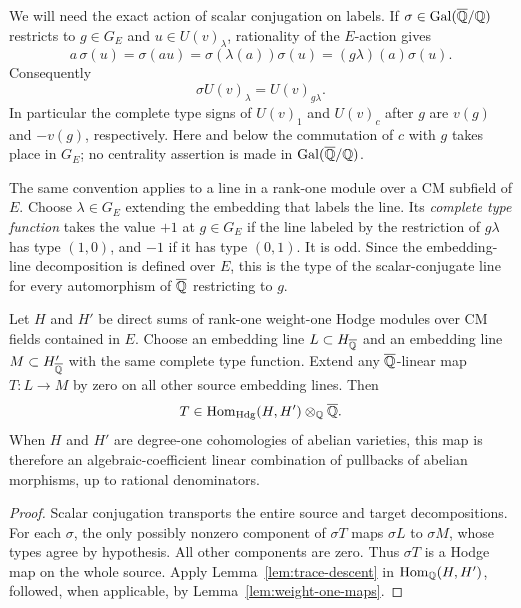 We will need the exact action of scalar conjugation on labels.  If
\(\sigma\in\operatorname{Gal}(\overline{\mathbb{Q}}/\mathbb{Q})\) restricts to \(g\in G_E\) and
\(u\in U(v)_\lambda\), rationality of the \(E\)-action gives
\[
 a\,\sigma(u)=\sigma(au)
             =\sigma(\lambda(a))\sigma(u)
             =(g\lambda)(a)\sigma(u).
\]
Consequently
\begin{equation}\label{eq:cm-label-conjugation}
 \sigma U(v)_\lambda=U(v)_{g\lambda}.
\end{equation}
In particular the complete type signs of \(U(v)_1\) and \(U(v)_c\)
after \(g\) are \(v(g)\) and \(-v(g)\), respectively.  Here and below
the commutation of \(c\) with \(g\) takes place in \(G_E\); no
centrality assertion is made in \(\operatorname{Gal}(\overline{\mathbb{Q}}/\mathbb{Q})\).

The same convention applies to a line in a rank-one module over a CM
subfield of \(E\).  Choose \(\lambda\in G_E\) extending the embedding
that labels the line.  Its \emph{complete type function} takes the value
\(+1\) at \(g\in G_E\) if the line labeled by the restriction of
\(g\lambda\) has type \((1,0)\), and \(-1\) if it has type \((0,1)\).
It is odd.  Since the embedding-line decomposition is defined over
\(E\), this is the type of the scalar-conjugate line for every
automorphism of \(\overline{\mathbb{Q}}\) restricting to \(g\).

\begin{lemma}\label{lem:cm-line-transfer}
Let \(H\) and \(H'\) be direct sums of rank-one weight-one Hodge
modules over CM fields contained in \(E\).  Choose an embedding line
\(L\subset H_{\overline{\mathbb{Q}}}\) and an embedding line \(M\subset H'_{\overline{\mathbb{Q}}}\)
with the same complete type function.  Extend any
\(\overline{\mathbb{Q}}\)-linear map \(T:L\to M\) by zero on all other source
embedding lines.  Then
\[
 T\in\operatorname{Hom}_{\mathrm{Hdg}}(H,H')\otimes_{\mathbb{Q}}\overline{\mathbb{Q}}.
\]
When \(H\) and \(H'\) are degree-one cohomologies of abelian varieties,
this map is therefore an algebraic-coefficient linear combination of
pullbacks of abelian morphisms, up to rational denominators.
\end{lemma}

\begin{proof}
Scalar conjugation transports the entire source and target
decompositions.  For each \(\sigma\), the only possibly nonzero
component of \(\sigma T\) maps \(\sigma L\) to \(\sigma M\), whose
types agree by hypothesis.  All other components are zero.  Thus
\(\sigma T\) is a Hodge map on the whole source.  Apply
Lemma~\ref{lem:trace-descent} in \(\operatorname{Hom}_{\mathbb{Q}}(H,H')\), followed, when
applicable, by Lemma~\ref{lem:weight-one-maps}.
\end{proof}


